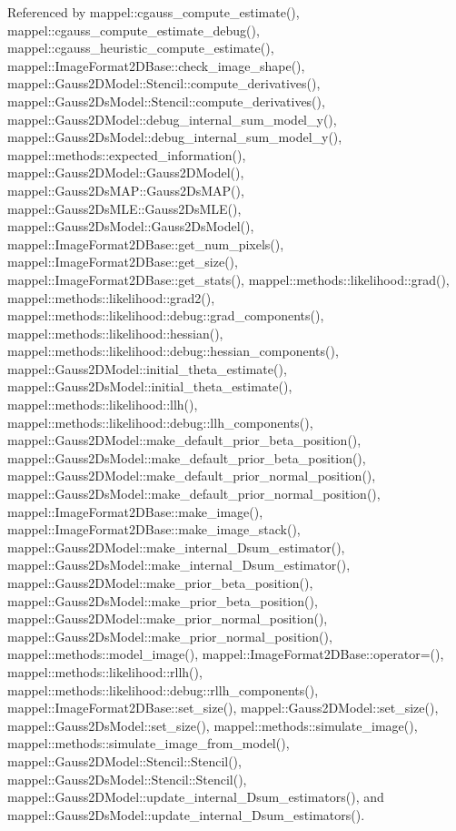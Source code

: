 Referenced by mappel\+::cgauss\+\_\+compute\+\_\+estimate(), mappel\+::cgauss\+\_\+compute\+\_\+estimate\+\_\+debug(), mappel\+::cgauss\+\_\+heuristic\+\_\+compute\+\_\+estimate(), mappel\+::\+Image\+Format2\+D\+Base\+::check\+\_\+image\+\_\+shape(), mappel\+::\+Gauss2\+D\+Model\+::\+Stencil\+::compute\+\_\+derivatives(), mappel\+::\+Gauss2\+Ds\+Model\+::\+Stencil\+::compute\+\_\+derivatives(), mappel\+::\+Gauss2\+D\+Model\+::debug\+\_\+internal\+\_\+sum\+\_\+model\+\_\+y(), mappel\+::\+Gauss2\+Ds\+Model\+::debug\+\_\+internal\+\_\+sum\+\_\+model\+\_\+y(), mappel\+::methods\+::expected\+\_\+information(), mappel\+::\+Gauss2\+D\+Model\+::\+Gauss2\+D\+Model(), mappel\+::\+Gauss2\+Ds\+M\+A\+P\+::\+Gauss2\+Ds\+M\+A\+P(), mappel\+::\+Gauss2\+Ds\+M\+L\+E\+::\+Gauss2\+Ds\+M\+L\+E(), mappel\+::\+Gauss2\+Ds\+Model\+::\+Gauss2\+Ds\+Model(), mappel\+::\+Image\+Format2\+D\+Base\+::get\+\_\+num\+\_\+pixels(), mappel\+::\+Image\+Format2\+D\+Base\+::get\+\_\+size(), mappel\+::\+Image\+Format2\+D\+Base\+::get\+\_\+stats(), mappel\+::methods\+::likelihood\+::grad(), mappel\+::methods\+::likelihood\+::grad2(), mappel\+::methods\+::likelihood\+::debug\+::grad\+\_\+components(), mappel\+::methods\+::likelihood\+::hessian(), mappel\+::methods\+::likelihood\+::debug\+::hessian\+\_\+components(), mappel\+::\+Gauss2\+D\+Model\+::initial\+\_\+theta\+\_\+estimate(), mappel\+::\+Gauss2\+Ds\+Model\+::initial\+\_\+theta\+\_\+estimate(), mappel\+::methods\+::likelihood\+::llh(), mappel\+::methods\+::likelihood\+::debug\+::llh\+\_\+components(), mappel\+::\+Gauss2\+D\+Model\+::make\+\_\+default\+\_\+prior\+\_\+beta\+\_\+position(), mappel\+::\+Gauss2\+Ds\+Model\+::make\+\_\+default\+\_\+prior\+\_\+beta\+\_\+position(), mappel\+::\+Gauss2\+D\+Model\+::make\+\_\+default\+\_\+prior\+\_\+normal\+\_\+position(), mappel\+::\+Gauss2\+Ds\+Model\+::make\+\_\+default\+\_\+prior\+\_\+normal\+\_\+position(), mappel\+::\+Image\+Format2\+D\+Base\+::make\+\_\+image(), mappel\+::\+Image\+Format2\+D\+Base\+::make\+\_\+image\+\_\+stack(), mappel\+::\+Gauss2\+D\+Model\+::make\+\_\+internal\+\_\+Dsum\+\_\+estimator(), mappel\+::\+Gauss2\+Ds\+Model\+::make\+\_\+internal\+\_\+Dsum\+\_\+estimator(), mappel\+::\+Gauss2\+D\+Model\+::make\+\_\+prior\+\_\+beta\+\_\+position(), mappel\+::\+Gauss2\+Ds\+Model\+::make\+\_\+prior\+\_\+beta\+\_\+position(), mappel\+::\+Gauss2\+D\+Model\+::make\+\_\+prior\+\_\+normal\+\_\+position(), mappel\+::\+Gauss2\+Ds\+Model\+::make\+\_\+prior\+\_\+normal\+\_\+position(), mappel\+::methods\+::model\+\_\+image(), mappel\+::\+Image\+Format2\+D\+Base\+::operator=(), mappel\+::methods\+::likelihood\+::rllh(), mappel\+::methods\+::likelihood\+::debug\+::rllh\+\_\+components(), mappel\+::\+Image\+Format2\+D\+Base\+::set\+\_\+size(), mappel\+::\+Gauss2\+D\+Model\+::set\+\_\+size(), mappel\+::\+Gauss2\+Ds\+Model\+::set\+\_\+size(), mappel\+::methods\+::simulate\+\_\+image(), mappel\+::methods\+::simulate\+\_\+image\+\_\+from\+\_\+model(), mappel\+::\+Gauss2\+D\+Model\+::\+Stencil\+::\+Stencil(), mappel\+::\+Gauss2\+Ds\+Model\+::\+Stencil\+::\+Stencil(), mappel\+::\+Gauss2\+D\+Model\+::update\+\_\+internal\+\_\+Dsum\+\_\+estimators(), and mappel\+::\+Gauss2\+Ds\+Model\+::update\+\_\+internal\+\_\+Dsum\+\_\+estimators().



